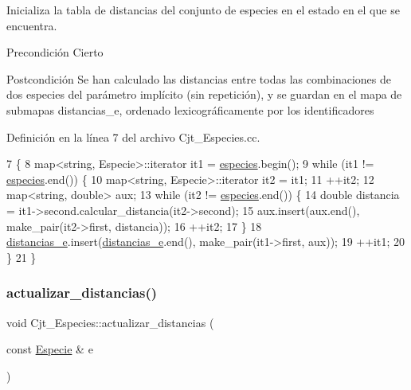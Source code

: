 Inicializa la tabla de distancias del conjunto de especies en el estado en el que se encuentra. 

\begin{DoxyPrecond}{Precondición}
Cierto 
\end{DoxyPrecond}
\begin{DoxyPostcond}{Postcondición}
Se han calculado las distancias entre todas las combinaciones de dos especies del parámetro implícito (sin repetición), y se guardan en el mapa de submapas \textquotesingle{}distancias\+\_\+e\textquotesingle{}, ordenado lexicográficamente por los identificadores 
\end{DoxyPostcond}


Definición en la línea 7 del archivo Cjt\+\_\+\+Especies.\+cc.


\begin{DoxyCode}
7                                           \{
8   map<string, Especie>::iterator it1 = \hyperlink{class_cjt___especies_a8f319699bd2e8a42b85ec47b67c17563}{especies}.begin();
9   \textcolor{keywordflow}{while} (it1 != \hyperlink{class_cjt___especies_a8f319699bd2e8a42b85ec47b67c17563}{especies}.end()) \{
10     map<string, Especie>::iterator it2 = it1;
11     ++it2;
12     map<string, double> aux;
13     \textcolor{keywordflow}{while} (it2 != \hyperlink{class_cjt___especies_a8f319699bd2e8a42b85ec47b67c17563}{especies}.end()) \{
14       \textcolor{keywordtype}{double} distancia = it1->second.calcular\_distancia(it2->second);
15       aux.insert(aux.end(), make\_pair(it2->first, distancia));
16       ++it2;
17     \}
18     \hyperlink{class_cjt___especies_ad1c8837b7e76b9a7610b65209aa7f5e9}{distancias\_e}.insert(\hyperlink{class_cjt___especies_ad1c8837b7e76b9a7610b65209aa7f5e9}{distancias\_e}.end(), make\_pair(it1->first, aux));
19     ++it1;
20   \}
21 \}
\end{DoxyCode}
\mbox{\label{class_cjt___especies_a74dc0d7118d70ee6e24e7dd84d49e688}} 
\subsubsection{\texorpdfstring{actualizar\+\_\+distancias()}{actualizar\_distancias()}}
{\footnotesize\ttfamily void Cjt\+\_\+\+Especies\+::actualizar\+\_\+distancias (\begin{DoxyParamCaption}\item[{const \hyperlink{class_especie}{Especie} \&}]{e }\end{DoxyParamCaption})\hspace{0.3cm}{\ttfamily [private]}}



